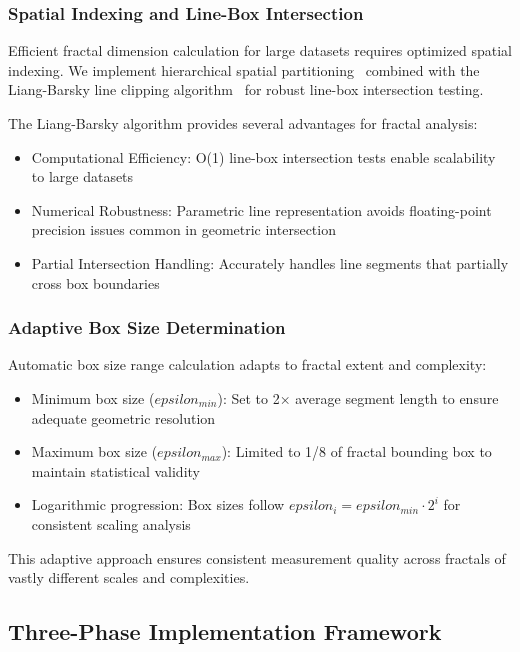\documentclass[preprint,12pt]{elsarticle}
\def\textbf#1{#1}%
\def\epsilon{epsilon}%
\begin{document}
\subsubsection{Spatial Indexing and Line-Box Intersection}

Efficient fractal dimension calculation for large datasets requires optimized spatial indexing. We implement hierarchical spatial partitioning~\cite{deBerg2008} combined with the Liang-Barsky line clipping algorithm~\cite{liang1984} for robust line-box intersection testing.

The Liang-Barsky algorithm provides several advantages for fractal analysis:
\begin{itemize}
\item \textbf{Computational Efficiency}: O(1) line-box intersection tests enable scalability to large datasets
\item \textbf{Numerical Robustness}: Parametric line representation avoids floating-point precision issues common in geometric intersection
\item \textbf{Partial Intersection Handling}: Accurately handles line segments that partially cross box boundaries
\end{itemize}

\subsubsection{Adaptive Box Size Determination}

Automatic box size range calculation adapts to fractal extent and complexity:

\begin{itemize}
\item \textbf{Minimum box size ($\epsilon_{min}$)}: Set to 2× average segment length to ensure adequate geometric resolution
\item \textbf{Maximum box size ($\epsilon_{max}$)}: Limited to 1/8 of fractal bounding box to maintain statistical validity
\item \textbf{Logarithmic progression}: Box sizes follow $\epsilon_i = \epsilon_{min} \cdot 2^i$ for consistent scaling analysis
\end{itemize}

This adaptive approach ensures consistent measurement quality across fractals of vastly different scales and complexities.

\subsection{Three-Phase Implementation Framework}
\end{document}
